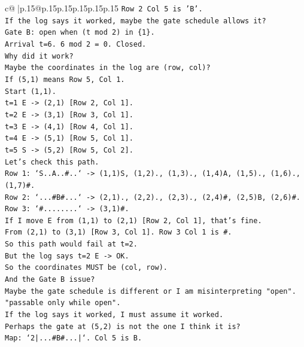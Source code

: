 \documentclass{article}
\begin{document}
{\begin{supertabular}{c@{$\;$}|p{.15\linewidth}@{}p{.15\linewidth}p{.15\linewidth}p{.15\linewidth}p{.15\linewidth}p{.15\linewidth}}
{{{\texttt{Row 2 Col 5 is 'B'.} \\
\texttt{If the log says it worked, maybe the gate schedule allows it?} \\
\texttt{Gate B: open when (t mod 2) in \{1\}.} \\
\texttt{Arrival t=6. 6 mod 2 = 0. Closed.} \\
\texttt{Why did it work?} \\
\texttt{Maybe the coordinates in the log are (row, col)?} \\
\texttt{If (5,1) means Row 5, Col 1.} \\
\texttt{Start (1,1).} \\
\texttt{t=1 E {-}> (2,1) {[}Row 2, Col 1{]}.} \\
\texttt{t=2 E {-}> (3,1) {[}Row 3, Col 1{]}.} \\
\texttt{t=3 E {-}> (4,1) {[}Row 4, Col 1{]}.} \\
\texttt{t=4 E {-}> (5,1) {[}Row 5, Col 1{]}.} \\
\texttt{t=5 S {-}> (5,2) {[}Row 5, Col 2{]}.} \\
\texttt{Let's check this path.} \\
\texttt{Row 1: `S..A..\#..` {-}> (1,1)S, (1,2)., (1,3)., (1,4)A, (1,5)., (1,6)., (1,7)\#.} \\
\texttt{Row 2: `...\#B\#...` {-}> (2,1)., (2,2)., (2,3)., (2,4)\#, (2,5)B, (2,6)\#.} \\
\texttt{Row 3: `\#........` {-}> (3,1)\#.} \\
\texttt{If I move E from (1,1) to (2,1) {[}Row 2, Col 1{]}, that's fine.} \\
\texttt{From (2,1) to (3,1) {[}Row 3, Col 1{]}. Row 3 Col 1 is \#.} \\
\texttt{So this path would fail at t=2.} \\
\texttt{But the log says t=2 E {-}> OK.} \\
\texttt{So the coordinates MUST be (col, row).} \\
\texttt{And the Gate B issue?} \\
\texttt{Maybe the gate schedule is different or I am misinterpreting "open".} \\
\texttt{"passable only while open".} \\
\texttt{If the log says it worked, I must assume it worked.} \\
\texttt{Perhaps the gate at (5,2) is not the one I think it is?} \\
\texttt{Map: `2|...\#B\#...|`. Col 5 is B.} \\
}}}
\end{supertabular}}
\end{document}
